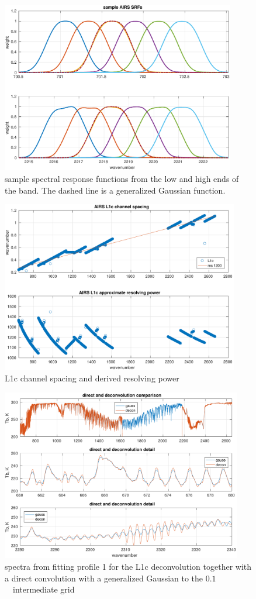 \documentclass[11pt]{article}
\begin{document}
\begin{figure} %
  \centering
  \includegraphics[height=7.5cm]{figures/airs_sample_srfs.pdf}
  \caption{sample {\airs} spectral response functions from the low
    and high ends of the band.   The dashed line is a generalized
    Gaussian function.}
  \label{srfs1}
\end{figure}

\begin{figure} %
  \centering
  \includegraphics[height=7.5cm]{figures/airs_L1c_res.pdf}
  \caption{{\airs} L1c channel spacing and derived resolving
    power}
  \label{chan1}
\end{figure}

\begin{figure} %
  \centering
  \includegraphics[height=7.5cm]{figures/airs_decon_spec.pdf}
  \caption{spectra from fitting profile 1 for the L1c deconvolution
    together with a direct convolution with a generalized Gaussian to
    the $0.1$~\wn\ intermediate grid}
  \label{dspec}
\end{figure}
\end{document}
